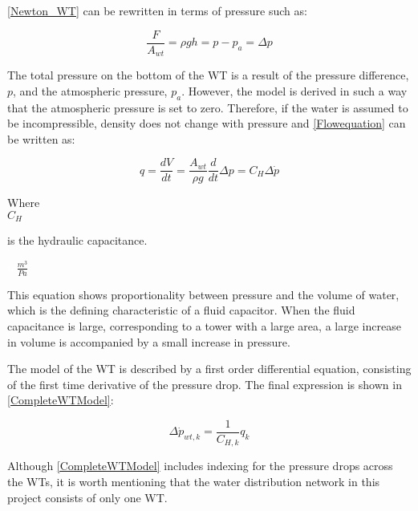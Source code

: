 \eqref{Newton_WT} can be rewritten in terms of pressure such as: 

\begin{equation}
  \frac{F}{A_{wt}} = \rho g h = p - p_a = \Delta p
  \label{Pressuredifference}
\end{equation}

The total pressure on the bottom of the WT is a result of the pressure difference, $p$, and the atmospheric pressure, $p_a$. However, the model is derived in such a way that the atmospheric pressure is set to zero. Therefore, if the water is assumed to be incompressible, density does not change with pressure and \eqref{Flowequation} can be written as: 

\begin{equation}
q = \frac{dV}{dt} = \frac{A_{wt}}{\rho g} \frac{d}{dt} \Delta p = C_H \Delta \dot{p}
  \label{FlowConservation}
\end{equation}

\begin{minipage}[t]{0.20\textwidth}
Where\\
\hspace*{8mm} $C_H$ 
\end{minipage}
\begin{minipage}[t]{0.68\textwidth}
\vspace*{2mm}
is the hydraulic capacitance.
\end{minipage}
\begin{minipage}[t]{0.10\textwidth}
\vspace*{2mm}
\textcolor{White}{te}$\unit{\frac{m^3}{Pa}}$
\end{minipage}

This equation shows proportionality between pressure and the volume of water, which is the defining characteristic of a fluid capacitor. When the fluid capacitance is large, corresponding to a tower with a large area, a large increase in volume is accompanied by a small increase in pressure. 

The model of the WT is described by a first order differential equation, consisting of the first time derivative of the pressure drop. The final expression is shown in \eqref{CompleteWTModel}:

\begin{equation}
  \label{CompleteWTModel}
  \Delta \dot{p}_{wt,k} = \frac{1}{C_{H,k}} q_k 
\end{equation}

Although \eqref{CompleteWTModel} includes indexing for the pressure drops across the WTs, it is worth mentioning that the water distribution network in this project consists of only one WT.


